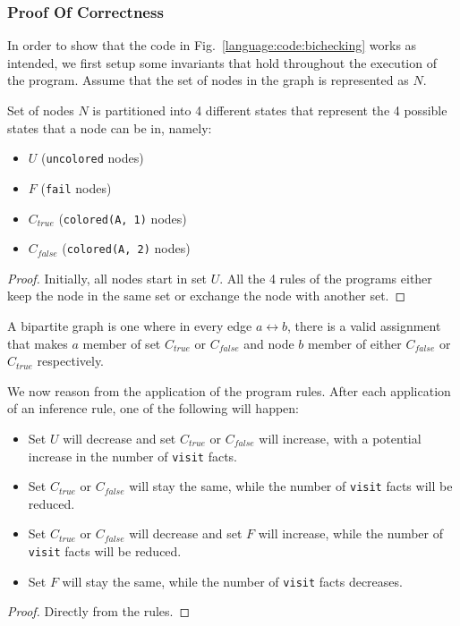 \subsubsection{Proof Of Correctness}

In order to show that the code in Fig.~\ref{language:code:bichecking} works as
intended, we first setup some invariants that hold throughout the execution of
the program. Assume that the set of nodes in the graph is represented as $N$.

\begin{invariant}
Set of nodes $N$ is partitioned into 4 different states that represent the 4
possible states that a node can be in, namely:

\begin{itemize}
   \item $U$ (\texttt{uncolored} nodes)
   \item $F$ (\texttt{fail} nodes)
   \item $C_{true}$ (\texttt{colored(A, 1)} nodes)
   \item $C_{false}$ (\texttt{colored(A, 2)} nodes)
\end{itemize}
\end{invariant}
\begin{proof}
Initially, all nodes start in set $U$. All the 4 rules of the programs either
keep the node in the same set or exchange the node with another set.
\end{proof}

A bipartite graph is one where in every edge $a \leftrightarrow b$, there is a
valid assignment that makes $a$ member of set $C_{true}$ or $C_{false}$ and node
$b$ member of either $C_{false}$ or $C_{true}$ respectively.

\begin{lemma}\label{language:lemma:bipartite_convergence}
   We now reason from the application of the program rules. After each
   application of an inference rule, one of the following will happen:

   \begin{itemize}
      \item Set $U$ will decrease and set $C_{true}$ or $C_{false}$ will
         increase, with a potential increase in the number of \texttt{visit}
         facts.
      \item Set $C_{true}$ or $C_{false}$ will stay the same, while the number
         of \texttt{visit} facts will be reduced.

      \item Set $C_{true}$ or $C_{false}$ will decrease and set $F$ will
         increase, while the number of \texttt{visit} facts will be reduced.

      \item Set $F$ will stay the same, while the number of \texttt{visit} facts
         decreases.
   \end{itemize}

\end{lemma}
\begin{proof}
Directly from the rules.
\end{proof}

